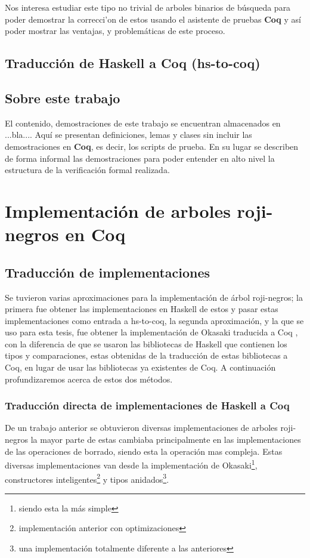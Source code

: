 \documentclass[letterpaper,12pt,oneside]{book}
\newcommand{\coq}{\textbf{Coq}}
\newcommand{\arn}{árbol roji-negro}
\newcommand{\arns}{arboles roji-negros}
\theoremstyle{plain}
\theoremstyle{definition}
\theoremstyle{remark}
\begin{document}
Nos interesa estudiar este tipo no trivial de arboles binarios de búsqueda para poder demostrar la 
correcci'on de estos usando el asistente de pruebas {\coq} y así poder mostrar las ventajas, y 
problemáticas de este proceso.
\section{Traducción de Haskell a {\coq} (hs-to-coq)}

\section {Sobre este trabajo}
El contenido, demostraciones de este trabajo se encuentran almacenados en ...bla.... Aqu\'i se presentan 
definiciones, lemas y clases sin incluir las demostraciones en {\coq}, es decir, los scripts de prueba. 
En su lugar se describen de forma informal las demostraciones para poder entender en alto nivel la 
estructura de la verificaci\'on formal realizada.

\chapter{Implementación de arboles roji-negros en {\coq}}
\section{Traducción de implementaciones}
Se tuvieron varias aproximaciones para la implementación de {{{{\arn}}}s}; la primera fue obtener las 
implementaciones en Haskell de estos\cite{tesisG} y pasar estas implementaciones como entrada a 
hs-to-coq, la segunda aproximación, y la que se uso para esta tesis, fue obtener la implementación de 
Okasaki traducida a Coq  \cite{MSetRBT}, con la diferencia de que se usaron las bibliotecas de Haskell 
que contienen los tipos y comparaciones, estas obtenidas de la traducción de estas bibliotecas a Coq, en 
lugar de usar las bibliotecas ya existentes de Coq.
A continuación profundizaremos acerca de estos dos métodos.
\subsection{Traducción directa de implementaciones de Haskell a Coq}
De un trabajo anterior\cite{tesisG} se obtuvieron diversas implementaciones de {\arns} la mayor parte de 
estas cambiaba principalmente en las implementaciones de las operaciones de borrado, siendo esta la 
operación mas compleja. 
Estas diversas implementaciones van desde la implementación de Okasaki\footnote{siendo esta la m\'as 
simple}, constructores inteligentes\footnote{implementaci\'on anterior con optimizaciones} y tipos 
anidados\footnote{una implementaci\'on totalmente diferente a las anteriores}.
\end{document}
